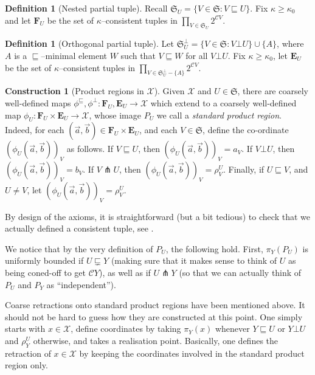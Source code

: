 \documentclass[11pt,oneside]{amsart}
\newcounter{ax}
\theoremstyle{definition}
\newtheorem{defn}[thm]{Definition}
\newtheorem{cons}[thm]{Construction}
\newcommand{\tup}[1]{\vec{#1}}
\newcommand{\co}{\colon}
\newcommand{\cuco}[1]{{\mathcal #1}}
\newcommand{\fontact}{{\mathcal C}}
\newcommand{\nest}{\sqsubseteq}
\newcommand{\propnest}{\sqsubsetneq}
\newcommand{\orth}{\bot}
\newcommand{\transverse}{\pitchfork}
\begin{document}
\begin{defn}[Nested partial tuple]\label{defn:nested_partial_tuple}
Recall $\mathfrak S_U=\{V\in\mathfrak S:V\nest U\}$.  Fix
$\kappa\geq\kappa_0$ and let $\mathbf F_U$ be the set of
$\kappa$--consistent tuples in $\prod_{V\in\mathfrak S_U}2^{\fontact
V}$.
\end{defn}

\begin{defn}[Orthogonal partial tuple]\label{defn:orthogonal_partial_tuple}
Let $\mathfrak S_U^\orth=\{V\in\mathfrak S:V\orth U\}\cup\{A\}$, where
$A$ is a $\nest$--minimal element $W$ such that $V\nest W$ for all
$V\orth U$.  Fix $\kappa\geq\kappa_0$, let $\mathbf E_U$ be the set of
$\kappa$--consistent tuples in $\prod_{V\in\mathfrak
S_U^\orth-\{A\}}2^{\fontact V}$.
\end{defn}

\begin{cons}[Product regions in $\cuco X$]\label{const:embedding_product_regions}
Given $\cuco X$ and $U\in\mathfrak S$, there are coarsely well-defined
maps $\phi^\nest,\phi^\orth\co\mathbf F_U,\mathbf E_U\to\cuco X$ which extend to a coarsely
well-defined map $\phi_U\co\mathbf F_U\times \mathbf E_U\to\cuco X$, whose image $P_U$ we call a \emph{standard product region}. Indeed, for each $(\tup a,\tup b)\in
\mathbf F_U\times \mathbf E_U$, and each $V\in\mathfrak S$, define the
co-ordinate $(\phi_U(\tup a,\tup b))_V$ as follows.  If $V\nest U$,
then $(\phi_U(\tup a,\tup b))_V=a_V$.  If $V\orth U$, then
$(\phi_U(\tup a,\tup b))_V=b_V$.  If $V\transverse U$, then
$(\phi_U(\tup a,\tup b))_V=\rho^U_V$.  Finally, if $U\nest V$, and
$U\neq V$, let $(\phi_U(\tup a,\tup b))_V=\rho^U_V$.

By design of the axioms, it is straightforward (but a bit tedious) to check that we actually defined a consistent tuple, see \cite[Section 13.1]{HHS1}.
\end{cons}

We notice that by the very definition of $P_U$, the following hold. First, $\pi_Y(P_U)$ is uniformly bounded if $U\propnest Y$ (making sure that it makes sense to think of $U$ as being coned-off to get $\fontact Y$), as well as if $U\transverse Y$ (so that we can actually think of $P_U$ and $P_Y$ as ``independent'').

Coarse retractions onto standard product regions have been mentioned above. It should not be hard to guess how they are constructed at this point. One simply starts with $x\in \cuco X$, define coordinates by taking $\pi_Y(x)$ whenever $Y\nest U$ or $Y\orth U$ and $\rho^U_Y$ otherwise, and takes a realisation point. Basically, one defines the retraction of $x\in\cuco X$ by keeping the coordinates involved in the standard product region only.
\end{document}
